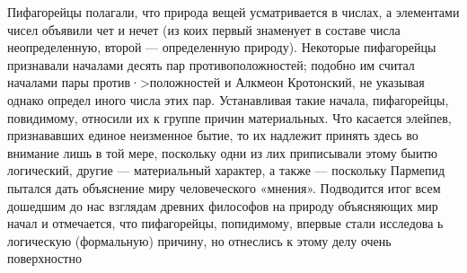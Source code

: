 \documentclass{article}
\begin{document}
Пифагорейцы полагали, что природа вещей усматривается в числах, а элементами чисел объявили чет и нечет (из коих первый знаменует в составе числа неопределенную, второй --- определенную природу). Некоторые пифагорейцы признавали началами десять пар противоположностей; подобно им считал началами пары против·>положностей и Алкмеон Кротонский, не указывая однако определ иного числа этих пар. Устанавливая такие начала, пифагорейцы, повидимому, относили их к группе причин материальных. Что касается элейпев, признававших единое неизменное бытие, то их надлежит принять здесь во внимание лишь в той мере, поскольку одни из лих приписывали этому быитю логический, другие --- материальный характер, а также --- поскольку Пармепид пытался дать объяснение миру человеческого «мнения». Подводится итог всем дошедшим до нас взглядам древних философов на природу объясняющих мир начал и отмечается, что пифагорейцы, попидимому, впервые стали исследова ь логическую (формальную) причину, но отнеслись к этому делу очень поверхностно
\end{document}
